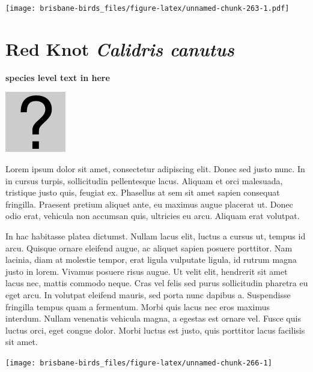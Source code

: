 \documentclass[]{book}
\let\origfigure\figure
\let\endorigfigure\endfigure
\renewenvironment{figure}[1][2] {
  \expandafter\origfigure\expandafter[H]
} {
  \endorigfigure
}
\begin{document}
\begin{figure}
\centering
\texttt{[image: brisbane-birds\_files/figure-latex/unnamed-chunk-263-1.pdf]}
\caption{\label{fig:unnamed-chunk-263}insert figure caption}
\end{figure}

\section{\texorpdfstring{Red Knot \emph{Calidris
canutus}}{Red Knot Calidris canutus}}\label{red-knot-calidris-canutus}

\textbf{species level text in here}

\begin{figure}
\centering
\includegraphics{assets/missing.png}
\caption{No image for species}
\end{figure}

Lorem ipsum dolor sit amet, consectetur adipiscing elit. Donec sed justo
nunc. In in cursus turpis, sollicitudin pellentesque lacus. Aliquam et
orci malesuada, tristique justo quis, feugiat ex. Phasellus at sem sit
amet sapien consequat fringilla. Praesent pretium aliquet ante, eu
maximus augue placerat ut. Donec odio erat, vehicula non accumsan quis,
ultricies eu arcu. Aliquam erat volutpat.

In hac habitasse platea dictumst. Nullam lacus elit, luctus a cursus ut,
tempus id arcu. Quisque ornare eleifend augue, ac aliquet sapien posuere
porttitor. Nam lacinia, diam at molestie tempor, erat ligula vulputate
ligula, id rutrum magna justo in lorem. Vivamus posuere risus augue. Ut
velit elit, hendrerit sit amet lacus nec, mattis commodo neque. Cras vel
felis sed purus sollicitudin pharetra eu eget arcu. In volutpat eleifend
mauris, sed porta nunc dapibus a. Suspendisse fringilla tempus quam a
fermentum. Morbi quis lacus nec eros maximus interdum. Nullam venenatis
vehicula magna, a egestas est ornare vel. Fusce quis luctus orci, eget
congue dolor. Morbi luctus est justo, quis porttitor lacus facilisis sit
amet.

\begin{figure}
\texttt{[image: brisbane-birds\_files/figure-latex/unnamed-chunk-266-1]} \caption{insert figure caption}\label{fig:unnamed-chunk-266}
\end{figure}
\end{document}
